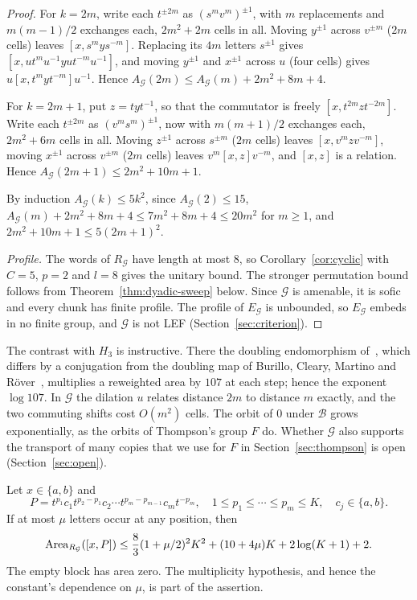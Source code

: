\begin{proof}
For $k=2m$, write each $t^{\pm2m}$ as $(s^mv^m)^{\pm1}$, with $m$ replacements and $m(m-1)/2$ exchanges each, $2m^2+2m$ cells in all. Moving
$y^{\pm1}$ across $v^{\pm m}$ ($2m$ cells) leaves $[x,s^mys^{-m}]$. Replacing its $4m$ letters $s^{\pm1}$ gives
$[x,ut^mu^{-1}yut^{-m}u^{-1}]$, and moving $y^{\pm1}$ and $x^{\pm1}$ across $u$ (four cells) gives $u[x,t^myt^{-m}]u^{-1}$. Hence
$A_{\mathcal G}(2m)\le A_{\mathcal G}(m)+2m^2+8m+4$.

For $k=2m+1$, put $z=tyt^{-1}$, so that the commutator is freely $[x,t^{2m}zt^{-2m}]$. Write each $t^{\pm2m}$ as $(v^ms^m)^{\pm1}$, now with
$m(m+1)/2$ exchanges each, $2m^2+6m$ cells in all. Moving $z^{\pm1}$ across $s^{\pm m}$ ($2m$ cells) leaves $[x,v^mzv^{-m}]$, moving
$x^{\pm1}$ across $v^{\pm m}$ ($2m$ cells) leaves $v^m[x,z]v^{-m}$, and $[x,z]$ is a relation. Hence $A_{\mathcal G}(2m+1)\le2m^2+10m+1$.

By induction $A_{\mathcal G}(k)\le5k^2$, since $A_{\mathcal G}(2)\le15$, $A_{\mathcal G}(m)+2m^2+8m+4\le7m^2+8m+4\le20m^2$ for $m\ge1$, and
$2m^2+10m+1\le5(2m+1)^2$.

\emph{Profile.} The words of $R_{\mathcal G}$ have length at most $8$, so Corollary~\ref{cor:cyclic} with $C=5$, $p=2$ and $l=8$ gives the
unitary bound. The stronger permutation bound follows from Theorem~\ref{thm:dyadic-sweep} below. Since $\mathcal G$ is amenable, it is sofic and every chunk has finite profile. The profile of $E_{\mathcal G}$ is unbounded, so
$E_{\mathcal G}$ embeds in no finite group, and $\mathcal G$ is not LEF (Section~\ref{sec:criterion}).
\end{proof}

The contrast with $H_3$ is instructive. There the doubling endomorphism of~\cite[Section~3]{DouglasMghirbiA}, which differs by a conjugation
from the doubling map of Burillo, Cleary, Martino and R\"over~\cite[Section~7]{BCMR2016}, multiplies a reweighted area by $107$ at each step;
hence the exponent $\log107$. In $\mathcal G$ the dilation $u$ relates distance $2m$ to distance $m$ exactly, and the two commuting shifts cost
$O(m^2)$ cells. The orbit of $0$ under $\mathcal B$ grows exponentially, as the orbits of Thompson's group $F$ do. Whether $\mathcal G$ also
supports the transport of many copies that we use for $F$ in Section~\ref{sec:thompson} is open (Section~\ref{sec:open}).


\begin{theorem}\label{thm:dyadic-sweep}
Let $x\in\{a,b\}$ and
\[
 P=t^{p_1}c_1t^{p_2-p_1}c_2\cdots t^{p_m-p_{m-1}}c_mt^{-p_m},
 \quad 1\le p_1\le\cdots\le p_m\le K,\quad c_j\in\{a,b\}.
\]
If at most $\mu$ letters occur at any position, then
\begin{equation}\label{eq:dyadic-sweep}
 \operatorname{Area}_{R_{\mathcal G}}([x,P])
 \le \frac83(1+\mu/2)^2K^2+(10+4\mu)K+2\log(K+1)+2.
\end{equation}
The empty block has area zero. The multiplicity hypothesis, and hence the constant's dependence on $\mu$, is part of the assertion.
\end{theorem}

